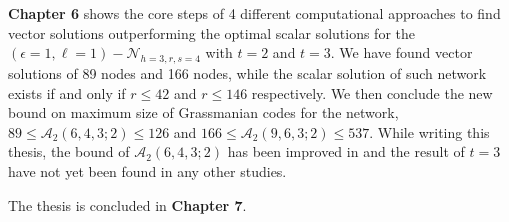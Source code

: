 \textbf{Chapter 6} shows the core steps of 4 different computational
approaches to find vector solutions outperforming the optimal scalar
solutions for the $\left(\epsilon=1,\ell=1\right)-\mathcal{N}_{h=3,r,s=4}$
with $t=2$ and $t=3$. We have found vector solutions of 89 nodes
and 166 nodes, while the scalar solution of such network exists if
and only if $r\leq42$ and $r\leq146$ respectively. We then conclude
the new bound on maximum size of Grassmanian codes for the network,
$89\leq\mathcal{A}_{2}\left(6,4,3;2\right)\leq126$ and $166\leq\mathcal{A}_{2}\left(9,6,3;2\right)\leq537$.
While writing this thesis, the bound of $\mathcal{A}_{2}\left(6,4,3;2\right)$
has been improved in \cite{Etzion:2018} and the result of $t=3$
have not yet been found in any other studies. 

The thesis is concluded in \textbf{Chapter 7}. 

\clearpage
